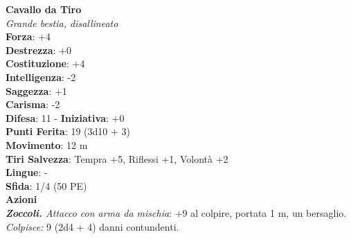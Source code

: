 \begin{multicols}{2}
\medskip\textbf{Cavallo da Tiro}\\
\emph{Grande bestia, disallineato}\\
\textbf{Forza}: +4\\
\textbf{Destrezza}: +0\\
\textbf{Costituzione}: +4\\
\textbf{Intelligenza}: -2\\
\textbf{Saggezza}: +1\\
\textbf{Carisma}: -2\\
\textbf{Difesa}: 11 - \textbf{Iniziativa}: +0\\
\textbf{Punti Ferita}: 19 (3d10 + 3)\\
\textbf{Movimento}: 12 m\\
\textbf{Tiri Salvezza}:  Tempra +5, Riflessi +1, Volontà +2 \\
\textbf{Lingue}: -\\
\textbf{Sfida}: 1/4 (50 PE)\smallskip\\
\smallskip\textbf{Azioni}\\
\emph{\textbf{Zoccoli.} Attacco con arma da mischia}: +9 al colpire, portata 1 m, un bersaglio.\\
\emph{Colpisce:} 9 (2d4 + 4) danni contundenti.\\


\end{multicols}
